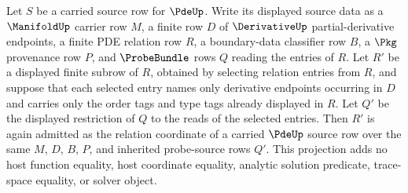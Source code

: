\begin{theorem}
\label{thm:pde-finite-relation-subrow-projection}
Let $S$ be a carried source row for $\PdeUp$. Write its displayed source data as a $\ManifoldUp$ carrier row $M$, a finite row $D$ of $\DerivativeUp$ partial-derivative endpoints, a finite PDE relation row $R$, a boundary-data classifier row $B$, a $\Pkg$ provenance row $P$, and $\ProbeBundle$ rows $Q$ reading the entries of $R$. Let $R'$ be a displayed finite subrow of $R$, obtained by selecting relation entries from $R$, and suppose that each selected entry names only derivative endpoints occurring in $D$ and carries only the order tags and type tags already displayed in $R$. Let $Q'$ be the displayed restriction of $Q$ to the reads of the selected entries. Then $R'$ is again admitted as the relation coordinate of a carried $\PdeUp$ source row over the same $M$, $D$, $B$, $P$, and inherited probe-source rows $Q'$. This projection adds no host function equality, host coordinate equality, analytic solution predicate, trace-space equality, or solver object.
\end{theorem}
